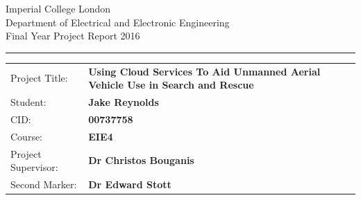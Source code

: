 \documentclass{article}
\begin{document}
\begin{titlepage}
                \setlength{\parindent}{0pt}
                \setlength{\parskip}{0pt}

                {
                                \Large
                                \raggedright
                                Imperial College London\\[17pt]
                                Department of Electrical and Electronic Engineering\\[17pt]
                                Final Year Project Report 2016\\[17pt]
 
                }

                \rule{\columnwidth}{3pt}
                \vfill
                \centering
                
                \vfill
                \setlength{\tabcolsep}{0pt}

                \begin{tabular}{p{40mm}p{\dimexpr\columnwidth-40mm}}
                                Project Title: & \textbf{Using Cloud Services To Aid Unmanned Aerial Vehicle Use in Search and Rescue} \\[12pt]
                                Student: & \textbf{Jake Reynolds} \\[12pt]
                                CID: & \textbf{00737758} \\[12pt]
                                Course: & \textbf{EIE4} \\[12pt]
                                Project Supervisor: & \textbf{Dr Christos Bouganis} \\[12pt]
                                Second Marker: & \textbf{Dr Edward Stott} \\
                \end{tabular}
\end{titlepage}
\end{document}
